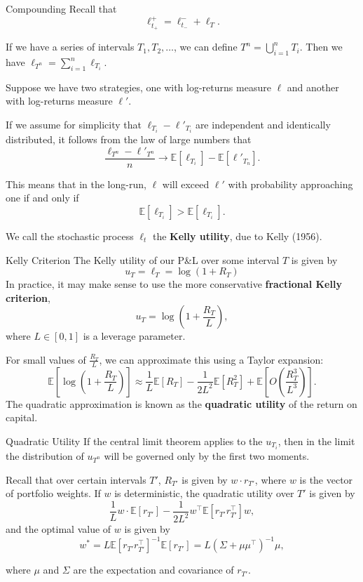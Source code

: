 \documentclass{beamer}
\begin{document}
\begin{frame}{Compounding}
	Recall that
	$$\ell_{t_+}^+ = \ell_{t_-}^- + \ell_T.$$

	If we have a series of intervals $T_1,T_2,\ldots$, we can define $T^n=\bigcup_{i=1}^n T_i$. Then we have $\ell_{T^n} = \sum_{i=1}^n \ell_{T_i}$.

	Suppose we have two strategies, one with log-returns measure $\ell$ and another with log-returns measure $\ell'$.

	If we assume for simplicity that $\ell_{T_i} - \ell'_{T_i}$ are independent and identically distributed, it follows from the law of large numbers that
	$$\frac{\ell_{T^n}-\ell'_{T^n}}{n} \to \mathbb{E}[\ell_{T_i}] - \mathbb{E}[\ell'_{T_n}].$$

	This means that in the long-run, $\ell$ will exceed $\ell'$ with probability approaching one if and only if
	$$\mathbb{E}[\ell_{T_i}]>\mathbb{E}[\ell_{T_i}].$$

	We call the stochastic process $\ell_t$ the \textbf{Kelly utility}, due to Kelly (1956).
\end{frame}

\begin{frame}{Kelly Criterion}
	The Kelly utility of our P\&L over some interval $T$ is given by
	$$u_T = \ell_T = \log(1 + R_T)$$
	In practice, it may make sense to use the more conservative \textbf{fractional Kelly criterion},
	$$u_T = \log(1 +\frac{R_T}{L}),$$
	where $L\in [0,1]$ is a leverage parameter.%

	For small values of $\frac{R_T}{L}$, we can approximate this using a Taylor expansion:
	$$\mathbb{E}[\log (1 + \frac{R_T}{L})] \approx \frac{1}{L}\mathbb{E}[R_T] - \frac{1}{2L^2}\mathbb{E}[R_T^2] + \mathbb{E}[O(\frac{R_T^3}{L^3})].$$
	The quadratic approximation is known as the \textbf{quadratic utility} of the return on capital.
\end{frame}

\begin{frame}{Quadratic Utility}
	If the central limit theorem applies to the $u_{T_i}$, then in the limit the distribution of $u_{T^n}$ will be governed only by the first two moments.

	Recall that over certain intervals $T'$, $R_{T'}$ is given by $w \cdot r_{T'}$, where $w$ is the vector of portfolio weights. If $w$ is deterministic, the quadratic utility over $T'$ is given by
	$$\frac{1}{L} w \cdot \mathbb{E}[r_{T'}] - \frac{1}{2L^2} w^\top \mathbb{E}[r_{T'} r_{T'}^\top] w,$$
	and the optimal value of $w$ is given by
	$$w^* = L \mathbb{E}[r_{T'} r_{T'}^\top]^{-1} \mathbb{E}[r_{T'}] = L (\Sigma+\mu \mu^\top)^{-1}\mu,$$

	where $\mu$ and $\Sigma$ are the expectation and covariance of $r_{T'}$.
\end{frame}
\end{document}
